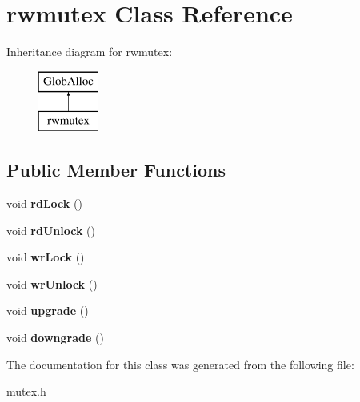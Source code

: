 \hypertarget{classrwmutex}{\section{rwmutex Class Reference}
\label{classrwmutex}
}
Inheritance diagram for rwmutex\-:\begin{figure}[H]
\begin{center}
\leavevmode
\includegraphics[height=2.000000cm]{classrwmutex}
\end{center}
\end{figure}
\subsection*{Public Member Functions}
\begin{DoxyCompactItemize}
\item 
\hypertarget{classrwmutex_aae015288d224f5bf12d202d92d0d93be}{void {\bfseries rd\-Lock} ()}\label{classrwmutex_aae015288d224f5bf12d202d92d0d93be}

\item 
\hypertarget{classrwmutex_af204a472049ed5247aa1ce9603a65dc9}{void {\bfseries rd\-Unlock} ()}\label{classrwmutex_af204a472049ed5247aa1ce9603a65dc9}

\item 
\hypertarget{classrwmutex_aff34df7af0f8f543bc1f3e27283b929b}{void {\bfseries wr\-Lock} ()}\label{classrwmutex_aff34df7af0f8f543bc1f3e27283b929b}

\item 
\hypertarget{classrwmutex_a7d2d2fa1767b90c47d42b39e93259a8d}{void {\bfseries wr\-Unlock} ()}\label{classrwmutex_a7d2d2fa1767b90c47d42b39e93259a8d}

\item 
\hypertarget{classrwmutex_a24880f8e002600d083fa8fc6d4a0a2b7}{void {\bfseries upgrade} ()}\label{classrwmutex_a24880f8e002600d083fa8fc6d4a0a2b7}

\item 
\hypertarget{classrwmutex_a3bfb46e5e15444e239dc3936f1461205}{void {\bfseries downgrade} ()}\label{classrwmutex_a3bfb46e5e15444e239dc3936f1461205}

\end{DoxyCompactItemize}


The documentation for this class was generated from the following file\-:\begin{DoxyCompactItemize}
\item 
mutex.\-h\end{DoxyCompactItemize}
